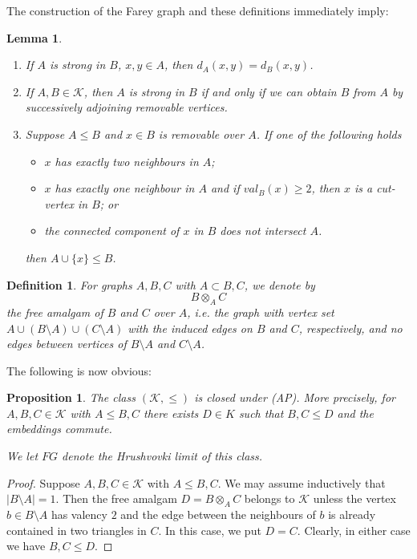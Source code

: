 \documentclass[10pt,a4paper]{amsart}
\newcommand{\K}{\mathcal{K}}
\newtheorem{definition}[defi]{Definition}
\newtheorem{lemma}[defi]{Lemma}
\newtheorem{proposition}[defi]{Proposition}
\begin{document}
The construction of the Farey graph and these definitions immediately imply:

\begin{lemma}\label{lem:strong after removing point}
\begin{enumerate}
\item   If $A$ is strong in $B$, $x,y\in A$, then $d_A(x,y)=d_B(x,y)$.
\item   If $A, B\in \K$, then $A$ is strong in $B$ if and only if we can obtain $B$ from $A$ by successively adjoining removable vertices.
\item  Suppose $A\leq B$ and $x\in B$ is removable over $A$. If one of the following holds
\begin{itemize}
\item $x$ has exactly two neighbours in $A$;
\item $x$ has exactly one neighbour in $A$ and if $val_B(x)\geq 2$, then $x$ is a cut-vertex in $B$; or
\item the connected component of $x$  in $B$ does not intersect $A$.
\end{itemize}
then $A\cup \{x \}\leq B$.
\end{enumerate}
  
  

   
\end{lemma}

\begin{definition}\label{def:free amalgam}
For graphs $A, B, C$ with $A\subset B, C$, we denote by
\[B\otimes_A C\]
the free amalgam of $B$ and $C$ over $A$, i.e. the graph with vertex set $A\cup (B\setminus A)\cup (C\setminus A)$ with the induced edges on $B$ and $C$, respectively, and no edges between vertices of $B\setminus A$ and $C\setminus A$.
\end{definition}

The following is now obvious:
\begin{proposition}\label{prop:amalgamtion}
    The class $(\K,\leq)$ is closed under (AP). More precisely, for  $A, B, C\in \K$ with $A\leq B, C$ there exists $D\in K$ such that $B,C\leq D$ and the embeddings commute.
    
    We let $FG$ denote the Hrushvovki limit of this class.
\end{proposition}
\begin{proof}
Suppose $A, B, C\in \K$ with $A\leq B, C$. We may assume inductively that $|B\setminus A|=1$. Then the free amalgam $D=B\otimes _A C$ belongs to $\K$ unless the vertex $b\in B\setminus A$ has valency $2$ and the edge between the neighbours of $b$ is already contained in two triangles in $C$. In this case, we put $D=C$. Clearly, in either case we have $B, C\leq D$. 
\end{proof}
\end{document}
